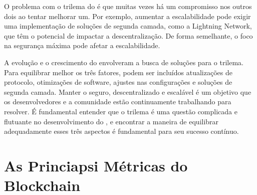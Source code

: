 \documentclass[a4paper,12pt]{article}
\newcommand{\printingbibliography}{%

    \pagestyle{myheadings}
    \markright{}
    \sloppy
    \printbibliography[heading=bibintoc, %
                   title=Refer\^encias %
                  ]
    \fussy%
}
\begin{document}
O problema com o trilema do \btcspace é que muitas vezes há um compromisso nos outros dois 
ao tentar melhorar um. Por exemplo, aumentar a escalabilidade pode exigir uma implementação 
de soluções de segunda camada, como a Lightning Network, que têm o potencial de impactar a
descentralização. De forma semelhante, o foco na segurança máxima pode afetar a escalabilidade.

A evolução e o crescimento do \btcspace envolveram a busca de soluções para o trilema. 
Para equilibrar melhor os três fatores, podem ser incluídos atualizações de protocolo, 
otimizações de software, ajustes nas configurações e soluções de segunda camada. Manter o \btcspace seguro, 
descentralizado e escalável é um objetivo que os desenvolvedores e a comunidade estão continuamente 
trabalhando para resolver. É fundamental entender que o trilema é uma questão complicada e flutuante 
no desenvolvimento do \btc, e encontrar a maneira de equilibrar adequadamente esses três aspectos é 
fundamental para seu sucesso contínuo.

\section{As Princiapsi Métricas do Blockchain}




\printingbibliography
\end{document}
